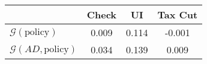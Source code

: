 \begin{tabular}{@{}lccc@{}}
\toprule
                          & Check      & UI    & Tax Cut    \\  \midrule
$\mathcal{G}(\text{policy})$ & 0.009  & 0.114  & -0.001     \\
$\mathcal{G}(AD,\text{policy})$ & 0.034  & 0.139  & 0.009     \\
\end{tabular}
